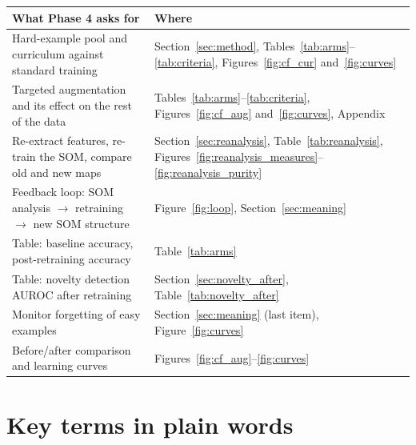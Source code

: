 \documentclass[11pt]{article}
\begin{document}
{\small
\renewcommand{\arraystretch}{1.12}
\begin{tabularx}{\textwidth}{|>{\raggedright\arraybackslash}p{}|X|}
\hline
\textbf{What Phase 4 asks for} & \textbf{Where} \\ \hline
Hard-example pool and curriculum against standard training & Section~\ref{sec:method}, Tables~\ref{tab:arms}--\ref{tab:criteria}, Figures~\ref{fig:cf_cur} and~\ref{fig:curves} \\ \hline
Targeted augmentation and its effect on the rest of the data & Tables~\ref{tab:arms}--\ref{tab:criteria}, Figures~\ref{fig:cf_aug} and~\ref{fig:curves}, Appendix \\ \hline
Re-extract features, re-train the SOM, compare old and new maps & Section~\ref{sec:reanalysis}, Table~\ref{tab:reanalysis}, Figures~\ref{fig:reanalysis_measures}--\ref{fig:reanalysis_purity} \\ \hline
Feedback loop: SOM analysis $\rightarrow$ retraining $\rightarrow$ new SOM structure & Figure~\ref{fig:loop}, Section~\ref{sec:meaning} \\ \hline
Table: baseline accuracy, post-retraining accuracy & Table~\ref{tab:arms} \\ \hline
Table: novelty detection AUROC after retraining & Section~\ref{sec:novelty_after}, Table~\ref{tab:novelty_after} \\ \hline
Monitor forgetting of easy examples & Section~\ref{sec:meaning} (last item), Figure~\ref{fig:curves} \\ \hline
Before/after comparison and learning curves & Figures~\ref{fig:cf_aug}--\ref{fig:curves} \\ \hline
\end{tabularx}}

\section{Key terms in plain words}
\end{document}
